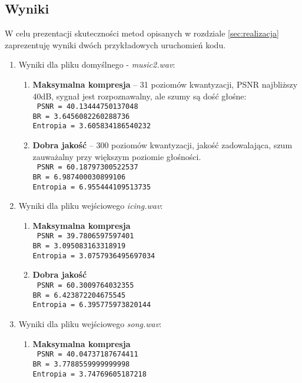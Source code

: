 \documentclass{article}
\def\code#1{\texttt{#1}}
\begin{document}
\begin{enumerate}
\section{Wyniki}
W celu prezentacji skuteczności metod opisanych w rozdziale \ref{sec:realizacja} zaprezentuję wyniki dwóch przykładowych uruchomień kodu.
\begin{enumerate}
\item Wyniki dla pliku domyślnego - \textit{music2.wav}:
    \begin{enumerate}
    \item \textbf{Maksymalna kompresja} -- 31 poziomów kwantyzacji, PSNR najbliższy 40dB, sygnał jest rozpoznawalny, ale szumy są dość głośne:\\  
    \code{
        PSNR = 40.13444750137048\\
        BR = 3.6456082260288736\\
        Entropia = 3.605834186540232}
    \item \textbf{Dobra jakość} -- 300 poziomów kwantyzacji, jakość zadowalająca, szum zauważalny przy większym poziomie głośności.\\
    \code{
        PSNR = 60.18797300522537\\
        BR = 6.987400030899106\\
        Entropia = 6.955444109513735}
    \end{enumerate}
\item Wyniki dla pliku wejściowego \textit{icing.wav}:
    \begin{enumerate}
    \item \textbf{Maksymalna kompresja}\\  
    \code{
        PSNR = 39.7806597597401\\
        BR = 3.095083163318919\\
        Entropia = 3.0757936495697034
    }

    \item \textbf{Dobra jakość}\\
    \code{
        PSNR = 60.3009764032355\\
        BR = 6.423872204675545\\
        Entropia = 6.395775973820144
    }
    \end{enumerate}
\item Wyniki dla pliku wejściowego \textit{song.wav}:
\begin{enumerate}
\item \textbf{Maksymalna kompresja}\\  
    \code{
        PSNR = 40.04737187674411\\
        BR = 3.7788559999999998\\
        Entropia = 3.74769605187218
    }


\end{enumerate}
\end{enumerate}
\end{enumerate}
\end{document}
